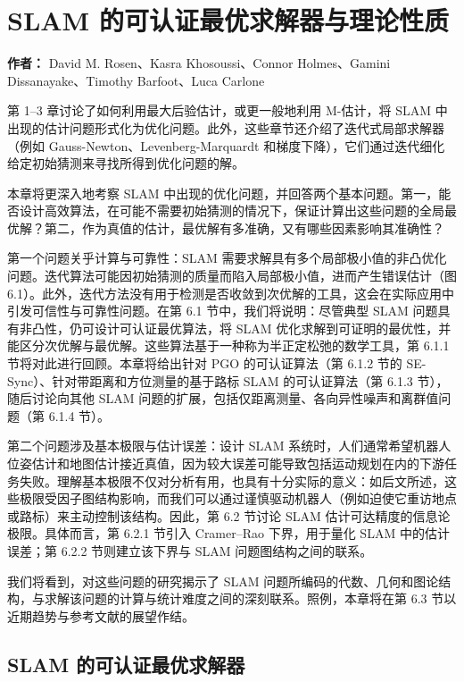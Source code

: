 \chapter{SLAM 的可认证最优求解器与理论性质}

\textbf{作者：} David M. Rosen、Kasra Khosoussi、Connor Holmes、Gamini Dissanayake、Timothy Barfoot、Luca Carlone

第 1–3 章讨论了如何利用最大后验估计，或更一般地利用 M-估计，将 SLAM 中出现的估计问题形式化为优化问题。此外，这些章节还介绍了迭代式局部求解器（例如 Gauss-Newton、Levenberg-Marquardt 和梯度下降），它们通过迭代细化给定初始猜测来寻找所得到优化问题的解。

本章将更深入地考察 SLAM 中出现的优化问题，并回答两个基本问题。第一，能否设计高效算法，在可能不需要初始猜测的情况下，保证计算出这些问题的全局最优解？第二，作为真值的估计，最优解有多准确，又有哪些因素影响其准确性？

第一个问题关乎计算与可靠性：SLAM 需要求解具有多个局部极小值的非凸优化问题。迭代算法可能因初始猜测的质量而陷入局部极小值，进而产生错误估计（图 6.1）。此外，迭代方法没有用于检测是否收敛到次优解的工具，这会在实际应用中引发可信性与可靠性问题。在第 6.1 节中，我们将说明：尽管典型 SLAM 问题具有非凸性，仍可设计可认证最优算法，将 SLAM 优化求解到可证明的最优性，并能区分次优解与最优解。这些算法基于一种称为半正定松弛的数学工具，第 6.1.1 节将对此进行回顾。本章将给出针对 PGO 的可认证算法（第 6.1.2 节的 SE-Sync）、针对带距离和方位测量的基于路标 SLAM 的可认证算法（第 6.1.3 节），随后讨论向其他 SLAM 问题的扩展，包括仅距离测量、各向异性噪声和离群值问题（第 6.1.4 节）。

第二个问题涉及基本极限与估计误差：设计 SLAM 系统时，人们通常希望机器人位姿估计和地图估计接近真值，因为较大误差可能导致包括运动规划在内的下游任务失败。理解基本极限不仅对分析有用，也具有十分实际的意义：如后文所述，这些极限受因子图结构影响，而我们可以通过谨慎驱动机器人（例如迫使它重访地点或路标）来主动控制该结构。因此，第 6.2 节讨论 SLAM 估计可达精度的信息论极限。具体而言，第 6.2.1 节引入 Cramer--Rao 下界，用于量化 SLAM 中的估计误差；第 6.2.2 节则建立该下界与 SLAM 问题图结构之间的联系。

我们将看到，对这些问题的研究揭示了 SLAM 问题所编码的代数、几何和图论结构，与求解该问题的计算与统计难度之间的深刻联系。照例，本章将在第 6.3 节以近期趋势与参考文献的展望作结。

\section{SLAM 的可认证最优求解器}

